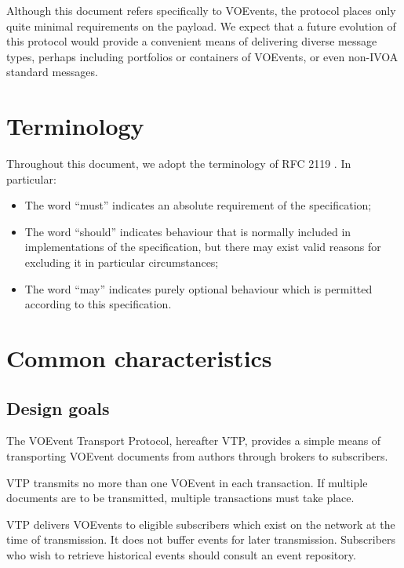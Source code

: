 \documentclass[a4paper,11pt]{ivoa}
\begin{document}
Although this document refers specifically to VOEvents, the protocol places
only quite minimal requirements on the payload. We expect that a future
evolution of this protocol would provide a convenient means of delivering
diverse message types, perhaps including portfolios or containers of VOEvents,
or even non-IVOA standard messages.

\section{Terminology}

Throughout this document, we adopt the terminology of RFC 2119
\citep{Bradner:1997}. In particular:

\begin{itemize}
    \item{The word ``must'' indicates an absolute requirement of the
    specification;}

    \item{The word ``should'' indicates behaviour that is normally included in
    implementations of the specification, but there may exist valid reasons
    for excluding it in particular circumstances;}

    \item{The word ``may'' indicates purely optional behaviour which is
    permitted according to this specification.}
\end{itemize}

\section{Common characteristics}

\subsection{Design goals}
\label{sec:common:design}

The VOEvent Transport Protocol, hereafter VTP, provides a simple means of
transporting VOEvent documents from authors through brokers to subscribers.

VTP transmits no more than one VOEvent in each transaction. If multiple
documents are to be transmitted, multiple transactions must take place.

VTP delivers VOEvents to eligible subscribers which exist on the network at
the time of transmission. It does not buffer events for later transmission.
Subscribers who wish to retrieve historical events should consult an event
repository.
\end{document}

